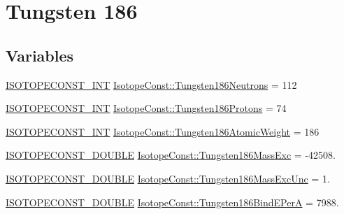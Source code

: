\hypertarget{group___isotope_const-_tungsten-_w186}{}\section{Tungsten 186}
\label{group___isotope_const-_tungsten-_w186}
\subsection*{Variables}
\begin{DoxyCompactItemize}
\item 
\mbox{\hyperlink{group___isotope_const-_macros_ga5f18360b3e99483a35c32d789e62621c}{I\+S\+O\+T\+O\+P\+E\+C\+O\+N\+S\+T\+\_\+\+I\+NT}} \mbox{\hyperlink{group___isotope_const-_tungsten-_w186_ga05dbd70e2b01eabea9e805a06496ffaf}{Isotope\+Const\+::\+Tungsten186\+Neutrons}} = 112
\item 
\mbox{\hyperlink{group___isotope_const-_macros_ga5f18360b3e99483a35c32d789e62621c}{I\+S\+O\+T\+O\+P\+E\+C\+O\+N\+S\+T\+\_\+\+I\+NT}} \mbox{\hyperlink{group___isotope_const-_tungsten-_w186_ga74c69270ad7ad81ba5e071458cfba08d}{Isotope\+Const\+::\+Tungsten186\+Protons}} = 74
\item 
\mbox{\hyperlink{group___isotope_const-_macros_ga5f18360b3e99483a35c32d789e62621c}{I\+S\+O\+T\+O\+P\+E\+C\+O\+N\+S\+T\+\_\+\+I\+NT}} \mbox{\hyperlink{group___isotope_const-_tungsten-_w186_ga40a04e563c18928935e437d11557bc56}{Isotope\+Const\+::\+Tungsten186\+Atomic\+Weight}} = 186
\item 
\mbox{\hyperlink{group___isotope_const-_macros_ga8f45a7272ce02c0b4c65c44636ed719a}{I\+S\+O\+T\+O\+P\+E\+C\+O\+N\+S\+T\+\_\+\+D\+O\+U\+B\+LE}} \mbox{\hyperlink{group___isotope_const-_tungsten-_w186_ga0a4aa526be7262ed6ba14fbb06ba3c43}{Isotope\+Const\+::\+Tungsten186\+Mass\+Exc}} = -\/42508.
\item 
\mbox{\hyperlink{group___isotope_const-_macros_ga8f45a7272ce02c0b4c65c44636ed719a}{I\+S\+O\+T\+O\+P\+E\+C\+O\+N\+S\+T\+\_\+\+D\+O\+U\+B\+LE}} \mbox{\hyperlink{group___isotope_const-_tungsten-_w186_ga614ede2f224306e3b2aeba2d246886ad}{Isotope\+Const\+::\+Tungsten186\+Mass\+Exc\+Unc}} = 1.
\item 
\mbox{\hyperlink{group___isotope_const-_macros_ga8f45a7272ce02c0b4c65c44636ed719a}{I\+S\+O\+T\+O\+P\+E\+C\+O\+N\+S\+T\+\_\+\+D\+O\+U\+B\+LE}} \mbox{\hyperlink{group___isotope_const-_tungsten-_w186_gab90865344d81ec52bcad3c6dbc0ff7e5}{Isotope\+Const\+::\+Tungsten186\+Bind\+E\+PerA}} = 7988.
\item 

\end{DoxyCompactItemize}
